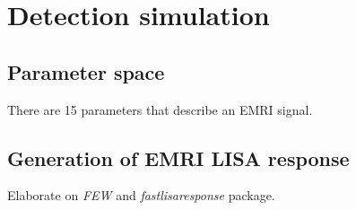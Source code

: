 \chapter{Detection simulation}\label{ch:detection-simulation}

\section{Parameter space}\label{sec:parameter-space}
There are 15 parameters that describe an EMRI signal.

\section{Generation of EMRI LISA response}\label{sec:generation-of-emri-lisa-response}
Elaborate on \emph{FEW} \cite{Katz_2021,Chua_2021} and \emph{fastlisaresponse} \cite{Katz_2022} package.

